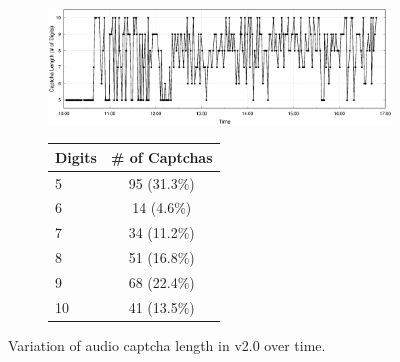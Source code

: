 \begin{figure}[t]
\begin{subfigure}{0.75\textwidth}
    \centering
    \includegraphics[width=1\textwidth]{figures/captcha_length.eps}
    \label{fig:length_time}
\end{subfigure} %
\begin{subfigure}{0.2\textwidth}
    \centering
    \label{tab:length}
    \begin{tabular}{lc}
    \toprule
    \textbf{Digits} & \textbf{\# of Captchas} \\
    \hline
    5 & 95 (31.3\%) \\
    \rowcolor{Gray} 
    6 & 14 (4.6\%) \\
    7 & 34 (11.2\%) \\
    \rowcolor{Gray} 
    8 & 51 (16.8\%) \\
    9 & 68 (22.4\%) \\
    \rowcolor{Gray} 
    10 & 41 (13.5\%)\\
    \bottomrule
    \end{tabular}
\end{subfigure}
\caption{Variation of audio captcha length in \re v2.0 over time.}
\label{fig:length}
\end{figure}

